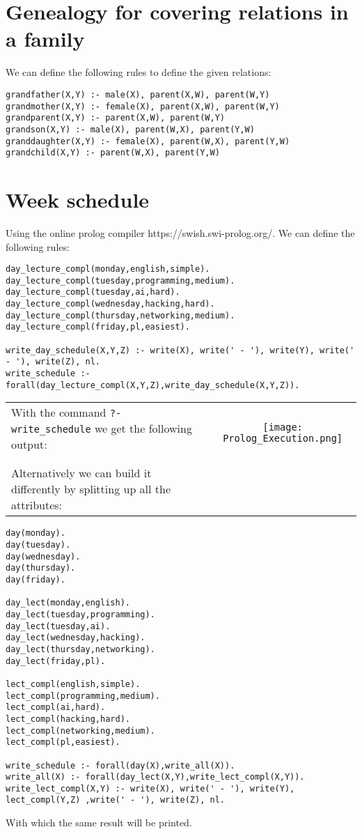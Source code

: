 \documentclass{report}
\begin{document}
	\section{Genealogy for covering relations in a family}
	\startsection
	We can define the following rules to define the given relations:
		\begin{verbatim}
grandfather(X,Y) :- male(X), parent(X,W), parent(W,Y)
grandmother(X,Y) :- female(X), parent(X,W), parent(W,Y)
grandparent(X,Y) :- parent(X,W), parent(W,Y)
grandson(X,Y) :- male(X), parent(W,X), parent(Y,W) 
granddaughter(X,Y) :- female(X), parent(W,X), parent(Y,W) 
grandchild(X,Y) :- parent(W,X), parent(Y,W)
		\end{verbatim}
	\closesection
	
	\section{Week schedule}
	\startsection
		Using the online prolog compiler https://swish.swi-prolog.org/. We can define the following rules:
		\begin{verbatim}
day_lecture_compl(monday,english,simple).
day_lecture_compl(tuesday,programming,medium).
day_lecture_compl(tuesday,ai,hard).
day_lecture_compl(wednesday,hacking,hard).
day_lecture_compl(thursday,networking,medium).
day_lecture_compl(friday,pl,easiest).

write_day_schedule(X,Y,Z) :- write(X), write(' - '), write(Y), write(' - '), write(Z), nl.
write_schedule :- forall(day_lecture_compl(X,Y,Z),write_day_schedule(X,Y,Z)).
		\end{verbatim}
		\begin{tabular}{llc}
			With the command \texttt{?- write\_schedule} we get the following output: & & \multirow{3}{*}{\texttt{[image: Prolog\_Execution.png]}} \\
			\\
			\\
			Alternatively we can build it differently by splitting up all the attributes:
		\end{tabular}
		\begin{adjustwidth}{-4em}{}
		\begin{verbatim}
day(monday). 
day(tuesday). 
day(wednesday). 
day(thursday). 
day(friday).

day_lect(monday,english).
day_lect(tuesday,programming).
day_lect(tuesday,ai).
day_lect(wednesday,hacking).
day_lect(thursday,networking).
day_lect(friday,pl).

lect_compl(english,simple).
lect_compl(programming,medium).
lect_compl(ai,hard).
lect_compl(hacking,hard).
lect_compl(networking,medium).
lect_compl(pl,easiest).

write_schedule :- forall(day(X),write_all(X)).
write_all(X) :- forall(day_lect(X,Y),write_lect_compl(X,Y)).
write_lect_compl(X,Y) :- write(X), write(' - '), write(Y), lect_compl(Y,Z) ,write(' - '), write(Z), nl.
		\end{verbatim}
		\end{adjustwidth}
		With which the same result will be printed.
	\closesection
\end{document}
